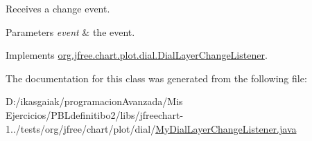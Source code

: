 Receives a change event.


\begin{DoxyParams}{Parameters}
{\em event} & the event. \\
\hline
\end{DoxyParams}


Implements \mbox{\hyperlink{interfaceorg_1_1jfree_1_1chart_1_1plot_1_1dial_1_1_dial_layer_change_listener_ad97d40ca8aa072d975cd285da2b07c75}{org.\+jfree.\+chart.\+plot.\+dial.\+Dial\+Layer\+Change\+Listener}}.



The documentation for this class was generated from the following file\+:\begin{DoxyCompactItemize}
\item 
D\+:/ikasgaiak/programacion\+Avanzada/\+Mis Ejercicios/\+P\+B\+Ldefinitibo2/libs/jfreechart-\/1../tests/org/jfree/chart/plot/dial/\mbox{\hyperlink{_my_dial_layer_change_listener_8java}{My\+Dial\+Layer\+Change\+Listener.\+java}}\end{DoxyCompactItemize}
